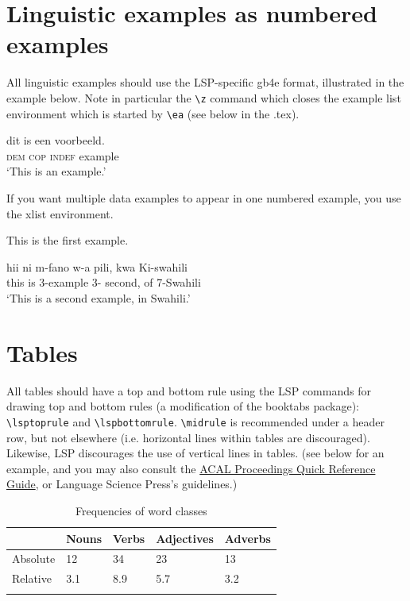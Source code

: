 \documentclass[output=paper,colorlinks,citecolor=brown,
]{langscibook}
\begin{document}
\section{Linguistic examples as numbered examples}

All linguistic examples should use the LSP-specific gb4e format, illustrated in the example below. Note in particular the \verb|\z| command which closes the example list environment which is started by \verb|\ea| (see below in the .tex).

\ea %
\gll  dit  is een voorbeeld.\\
\textsc{dem} \textsc{cop} \textsc{indef} example\\
\glt  ‘This is an example.’
\z

\noindent If you want multiple data examples to appear in one numbered example, you use the xlist environment. 

\ea \label{ex:diercks:XlistExample}
\begin{xlist}

\ex This is the first example. 

\ex \label{ex:diercks:SwahiliXlist}
\gll hii ni m-fano w-a pili, kwa Ki-swahili \\
this is 3-example 3-\Assoc{} second, of 7-Swahili \\
\glt `This is a second example, in Swahili.' 

\end{xlist}

\z 

\section{Tables}

All tables should have a top and bottom rule using the LSP commands for drawing top and bottom rules (a modification of the booktabs package): \verb|\lsptoprule| and \verb|\lspbottomrule|. \verb|\midrule| is recommended under a header row, but not elsewhere (i.e. horizontal lines within tables are discouraged). Likewise, LSP discourages the use of vertical lines in tables. (see below for an example, and you may also consult the \href{https://www.overleaf.com/latex/templates/acal-proceedings-latex-quick-reference-guide/fncrcrtgnxhv}{ACAL Proceedings Quick Reference Guide}, or Language Science Press's guidelines.)

\begin{table}
\caption{Frequencies of word classes}
\label{tab:Diercks:PosFrequency}
 \begin{tabular}{lllll}
  \lsptoprule
            & Nouns & Verbs & Adjectives & Adverbs\\
  \midrule
  Absolute  &   12 & 34 & 23 & 13 \\
  Relative  &   3.1 & 8.9 & 5.7 & 3.2 \\
  \lspbottomrule
 \end{tabular}
\end{table}
\end{document}
